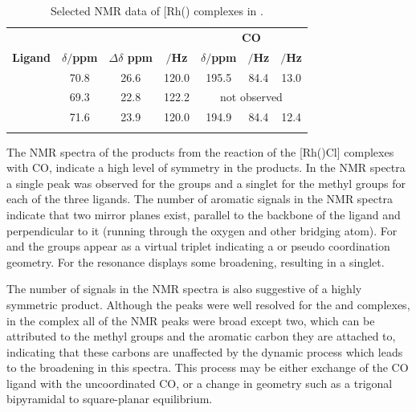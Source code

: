 \begin{table}[htbp]
\caption[Selected NMR data of [Rh(\tBuxantphos)\ce{(CO)2Cl}{]} complexes]{Selected NMR data of [Rh(\tBuxantphos)\ce{(CO)2Cl]} complexes in .}
\vspace{1em}
\label{table:rhodiumcarbonyl}
\small
\begin{center}
\begin{tabular}{l c c c c c c}
	\toprule{}
	~ & \multicolumn{3}{c}{\bfseries{\phosphorus}} & \multicolumn{3}{c}{\bfseries{\carbon{} CO}} \\
	\cmidrule(lr){2-4} \cmidrule(lr){5-7}
	\bfseries{Ligand}&\bfseries{$\delta/$ppm}&\bfseries{$\Delta\delta$ ppm}&\bfseries{\JRhP{}$/$Hz}&\bfseries{$\delta/$ppm}&\bfseries{\JRhC $/$Hz}&\bfseries{\JPC $/$Hz}\\
	\midrule
	\tBuSixantphos	&	70.8	&	26.6 & 120.0	&	195.5	& 84.4	& 13.0\\
	\tBuThixantphos	& 	69.3	&	22.8	& 122.2	&	\multicolumn{3}{c}{not observed}\\
	\tBuXantphos	&	71.6	&	23.9	& 120.0	&	194.9	& 84.4	& 12.4\\
	\bottomrule{}
\end{tabular}
\end{center}
\end{table}


The NMR spectra of the products from the reaction of the [Rh(\tBuxantphos)Cl] complexes with CO, indicate a high level of symmetry in the products.  In the \proton{} NMR spectra a single peak was observed for the \tBu{} groups and a singlet for the methyl groups for each of the three ligands.  The number of aromatic signals in the \proton{} NMR spectra indicate that two mirror planes exist, parallel to the backbone of the ligand and perpendicular to it (running through the oxygen and other bridging atom).  For \tBusixantphos{} and \tBuxantphos{} the \tBu{} groups appear as a virtual triplet indicating a \trans{} or pseudo \trans{} coordination geometry.  For \tButhixantphos{} the \tBu{} resonance displays some broadening, resulting in a singlet.

The number of signals in the \carbon{} NMR spectra is also suggestive of a highly symmetric product. Although the peaks were well resolved for the \tBusixantphos{} and \tBuxantphos{} complexes, in the \tButhixantphos{} complex all of the \carbon{} NMR peaks were broad except two, which can be attributed to the methyl groups and the aromatic carbon they are attached to, indicating that these carbons are unaffected by the dynamic process which leads to the broadening in this spectra.  This process may be either exchange of the CO ligand with the uncoordinated CO, or a change in geometry such as a trigonal bipyramidal to square-planar equilibrium.  

